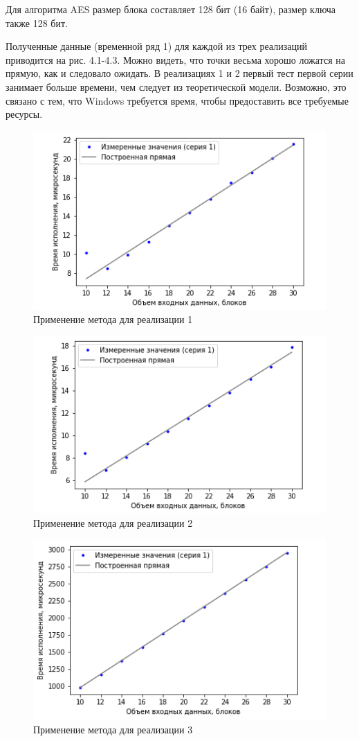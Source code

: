 Для алгоритма AES размер блока составляет 128 бит (16 байт), размер ключа также 128 бит.

Полученные данные (временной ряд 1) для каждой из трех реализаций приводится на рис. 4.1-4.3. Можно видеть, что точки весьма хорошо ложатся на прямую, как и следовало ожидать. В реализациях 1 и 2 первый тест первой серии занимает больше времени, чем следует из теоретической модели. Возможно, это связано с тем, что Windows требуется время, чтобы предоставить все требуемые ресурсы.

\begin{figure}[ht!] 
	\includegraphics [scale=0.9] {my_folder/plots//plot1}
	\centering
	\caption{Применение метода для реализации 1} 
\end{figure}

\begin{figure}[ht!] 
	\includegraphics [scale=0.9] {my_folder/plots//plot2}
	\centering
	\caption{Применение метода для реализации 2} 
\end{figure}

\begin{figure}[ht!] 
	\includegraphics [scale=0.9] {my_folder/plots//plot3}
	\centering
	\caption{Применение метода для реализации 3} 
\end{figure}

